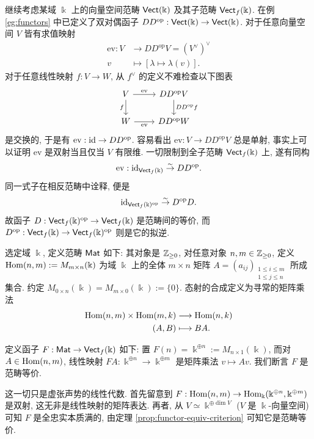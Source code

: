 \begin{example}\label{eg:vectf-duality}
	继续考虑某域 $\Bbbk$ 上的向量空间范畴 $\mathsf{Vect}(\Bbbk)$ 及其子范畴 $\mathsf{Vect}_f(\Bbbk)$. 在例 \ref{eg:functors} 中已定义了双对偶函子 $D D^\text{op}: \mathsf{Vect}(\Bbbk) \to \mathsf{Vect}(\Bbbk)$. 对于任意向量空间 $V$ 皆有求值映射
	\begin{align*}
		\text{ev}: V & \longrightarrow DD^\text{op} V = (V^\vee)^\vee \\
		v & \longmapsto [\lambda \mapsto \lambda(v)].
	\end{align*}
	对于任意线性映射 $f: V \to W$, 从 $f^\vee$ 的定义不难检查以下图表
	\[\begin{tikzcd}
		V \arrow[r, "\text{ev}"] \ar[d, "f"'] & DD^\text{op} V \arrow[d, "{DD^\text{op} f}"] \\
		W \ar[r, "\text{ev}"'] & DD^\text{op} W
	\end{tikzcd} \]
	是交换的, 于是有 $\text{ev}: \mathrm{id} \to D D^\text{op}$. 容易看出 $\text{ev}: V \to D D^\text{op} V$ 总是单射, 事实上可以证明 $\text{ev}$ 是双射当且仅当 $V$ 有限维. 一切限制到全子范畴 $\mathsf{Vect}_f(\Bbbk)$ 上, 遂有同构
	\[ \text{ev}: \mathrm{id}_{\mathsf{Vect}_f(\Bbbk)} \stackrel{\sim}{\rightarrow} D D^\text{op}. \]
	同一式子在相反范畴中诠释, 便是
	\[ \mathrm{id}_{\mathsf{Vect}_f(\Bbbk)^\text{op}} \stackrel{\sim}{\rightarrow} D^\text{op} D. \]
	故函子 $D: \mathsf{Vect}_f(\Bbbk)^\text{op} \to \mathsf{Vect}_f(\Bbbk)$ 是范畴间的等价, 而 $D^\text{op}: \mathsf{Vect}_f(\Bbbk) \to \mathsf{Vect}_f(\Bbbk)^\text{op}$ 则是它的拟逆.
\end{example}

\begin{example}
	选定域 $\Bbbk$, 定义范畴 $\mathsf{Mat}$ 如下: 其对象是 $\mathbb{Z}_{\geq 0}$, 对任意对象 $n, m \in \mathbb{Z}_{\geq 0}$, 定义 $\operatorname{Hom}(n, m) := M_{m \times n}(\Bbbk)$ 为域 $\Bbbk$ 上的全体 $m \times n$ 矩阵 $A = (a_{ij})_{\substack{1 \leq i \leq m \\ 1 \leq j \leq n}}$ 所成集合. 约定 $M_{0 \times n}(\Bbbk) = M_{m \times 0}(\Bbbk) := \{0\}$. 态射的合成定义为寻常的矩阵乘法
	\begin{align*}
		\operatorname{Hom}(n, m) \times \operatorname{Hom}(m, k) & \longrightarrow \operatorname{Hom}(n, k) \\
		(A, B) & \longmapsto BA .
	\end{align*}

	定义函子 $F: \mathsf{Mat} \to \mathsf{Vect}_f(\Bbbk)$ 如下: 置 $F(n) = \Bbbk^{\oplus n} := M_{n \times 1}(\Bbbk)$, 而对 $A \in \operatorname{Hom}(n, m)$, 线性映射 $FA: \Bbbk^{\oplus n} \to \Bbbk^{\oplus m}$ 是矩阵乘法 $v \mapsto Av$. 我们断言 $F$ 是范畴等价.

	这一切只是虚张声势的线性代数. 首先留意到 $F: \operatorname{Hom}(n, m) \to \operatorname{Hom}_\Bbbk(\Bbbk^{\oplus n}, \Bbbk^{\oplus m})$ 是双射, 这无非是线性映射的矩阵表达. 再者, 从 $V \simeq \Bbbk^{\oplus \dim V}$ ($V$ 是 $\Bbbk$-向量空间) 可知 $F$ 是全忠实本质满的, 由定理 \ref{prop:functor-equiv-criterion} 可知它是范畴等价.
\end{example}

